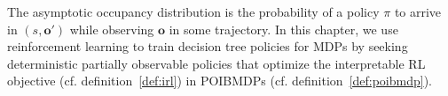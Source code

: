 The asymptotic occupancy distribution is the probability of a policy $\pi$ to arrive in $(s,\boldsymbol{o}')$ while observing $\boldsymbol{o}$ in some trajectory.  
In this chapter, we use reinforcement learning to train decision tree policies for MDPs by seeking deterministic partially observable policies that optimize the interpretable RL objective (cf. definition~\ref{def:irl}) in POIBMDPs (cf. definition~\ref{def:poibmdp}).

    
    
    
    

    
    
